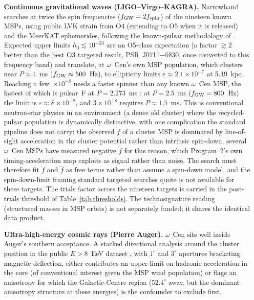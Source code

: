 \documentclass[11pt]{article}
\newcommand{\ocen}{\ensuremath{\omega}~Cen}
\begin{document}
\textbf{Continuous gravitational waves (LIGO--Virgo--KAGRA).} Narrowband searches at twice the spin frequencies ($f_{\rm GW} = 2f_{\rm spin}$) of the nineteen known MSPs, using public LVK strain from O4 (extending to O5 when it is released) and the MeerKAT ephemerides, following the known-pulsar methodology of \citet{LVKPulsars2022}. Expected upper limits $h_{0} \lesssim 10^{-26}$ are an O5-class expectation (a factor $\gtrsim2$ better than the best O3 targeted result, PSR~J0711$-$6830, once converted to this frequency band) and translate, at \ocen's own MSP population, which clusters near $P \approx 4$~ms ($f_{\rm GW} \approx 500$~Hz), to ellipticity limits $\varepsilon \approx 2.1\times10^{-7}$ at 5.49~kpc. Reaching a few~$\times10^{-8}$ needs a faster spinner than any known \ocen{} MSP, the fastest of which is pulsar~F at $P = 2.273$~ms \citep{ColomiBernadich2026}: at $P = 2.5$~ms ($f_{\rm GW} = 800$~Hz) the limit is $\varepsilon \approx 8\times10^{-8}$, and $3\times10^{-8}$ requires $P \approx 1.5$~ms. This is conventional neutron-star physics in an environment (a dense old cluster) where the recycled-pulsar population is dynamically distinctive, with one complication the standard pipeline does not carry: the observed $\dot f$ of a cluster MSP is dominated by line-of-sight acceleration in the cluster potential rather than intrinsic spin-down, several \ocen{} MSPs have measured negative $\dot f$ for this reason, which Program~2's own timing-acceleration map exploits as signal rather than noise. The search must therefore fit $\dot f$ and $\ddot f$ as free terms rather than assume a spin-down model, and the spin-down-limit framing standard targeted searches quote is not available for these targets. The trials factor across the nineteen targets is carried in the post-trials threshold of Table~\ref{tab:thresholds}. The technosignature reading (structured masses in MSP orbits) is not separately funded; it shares the identical data product.

\textbf{Ultra-high-energy cosmic rays (Pierre Auger).} \ocen{} sits well inside Auger's southern acceptance. A stacked directional analysis around the cluster position in the public $E > 8$~EeV dataset \citep{Auger2017}, with $1^{\circ}$ and $3^{\circ}$ apertures bracketing magnetic deflection, either contributes an upper limit on hadronic acceleration in the core (of conventional interest given the MSP wind population) or flags an anisotropy for which the Galactic-Centre region ($52.4^{\circ}$ away, but the dominant anisotropy structure at these energies) is the confounder to exclude first.
\end{document}

